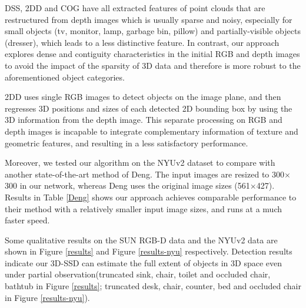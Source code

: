 \documentclass[10pt,twocolumn,letterpaper]{article}
\begin{document}
	DSS, 2DD and COG have all extracted features of point clouds that are restructured from depth images which is usually sparse and noisy, especially for small objects (\eg tv, monitor, lamp, garbage bin, pillow) and partially-visible objects (\eg dresser), which leads to a less distinctive feature. In contrast, our approach explores dense and contiguity characteristics in the initial RGB and depth images to avoid the impact of the sparsity of 3D data and therefore is more robust to the aforementioned object categories.\par
	
	2DD uses single RGB images to detect objects on the image plane, and then regresses 3D positions and sizes of each detected 2D bounding box by using the 3D information from the depth image. This separate processing on RGB and depth images is incapable to integrate complementary information of texture and geometric features, and resulting in a less satisfactory performance. \par
	
	Moreover, we tested our algorithm on the NYUv2 dataset to compare with another state-of-the-art method of Deng\cite{Deng2017}. The input images are resized to 300$\times$300 in our network, whereas Deng uses the original image sizes (561$\times$427). Results in Table \ref{Deng} shows our approach achieves comparable performance to their method with a relatively smaller input image sizes, and runs at a much faster speed. \par
	
	Some qualitative results on the SUN RGB-D data and the NYUv2 data are shown in Figure \ref{results} and Figure \ref{results-nyu} respectively. Detection results indicate our 3D-SSD can estimate the full extent of objects in 3D space even under partial observation(\eg truncated sink, chair, toilet and occluded chair, bathtub in Figure \ref{results}; truncated desk, chair, counter, bed and occluded chair in Figure \ref{results-nyu}). 
	
\end{document}
